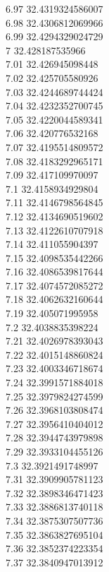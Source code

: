 {6.97	32.4319324586007\\
6.98	32.4306812069966\\
6.99	32.4294329024729\\
7	32.428187535966\\
7.01	32.426945098448\\
7.02	32.425705580926\\
7.03	32.4244689744424\\
7.04	32.4232352700745\\
7.05	32.4220044589341\\
7.06	32.420776532168\\
7.07	32.4195514809572\\
7.08	32.4183292965171\\
7.09	32.417109970097\\
7.1	32.4158934929804\\
7.11	32.4146798564845\\
7.12	32.4134690519602\\
7.13	32.4122610707918\\
7.14	32.411055904397\\
7.15	32.4098535442266\\
7.16	32.4086539817644\\
7.17	32.4074572085272\\
7.18	32.4062632160644\\
7.19	32.405071995958\\
7.2	32.4038835398224\\
7.21	32.4026978393043\\
7.22	32.4015148860824\\
7.23	32.4003346718674\\
7.24	32.3991571884018\\
7.25	32.3979824274599\\
7.26	32.3968103808474\\
7.27	32.3956410404012\\
7.28	32.3944743979898\\
7.29	32.3933104455126\\
7.3	32.3921491748997\\
7.31	32.3909905781123\\
7.32	32.3898346471423\\
7.33	32.3886813740118\\
7.34	32.3875307507736\\
7.35	32.3863827695104\\
7.36	32.3852374223354\\
7.37	32.3840947013912\\
}
